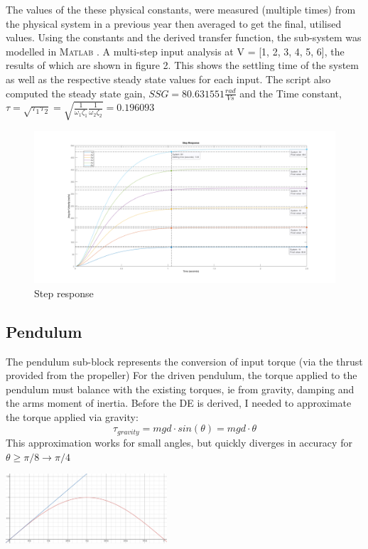 \documentclass[a4paper,11pt]{article}
\newcommand{\matlab}{\textsc{Matlab }} %
\begin{document}
The values of the these physical constants, were measured (multiple times) from the physical system in a previous year then averaged to get the final, utilised values. Using the constants and the derived transfer function, the sub-system was modelled in \matlab. A multi-step input analysis at V = [1, 2, 3, 4, 5, 6], the results of which are shown in figure 2. This shows the settling time of the system as well as the respective steady state values for each input. The script also computed the steady state gain, $SSG = 80.631551 \frac{rad}{Vs}$ and the Time constant, $\tau = \sqrt{\tau_1 \tau_2} = \sqrt{\frac{1}{\omega_1 \zeta_1} \frac{1}{\omega_2 \zeta_2}} = 0.196093$

\begin{figure}[h]
        \centering
        \includegraphics[width=\textwidth]{inc/motor_steps.png}
        \caption{Step response}
        \label{}
\end{figure}

\newpage
\subsection{Pendulum}
The pendulum sub-block represents the conversion of input torque (via the thrust provided from the propeller)
For the driven pendulum, the torque applied to the pendulum must balance with the existing torques, ie from gravity, damping and the arms moment of inertia. Before the DE is derived, I needed to approximate the torque applied via gravity:
$$\tau_{gravity} = mgd{\cdot}sin(\theta) = mgd{\cdot}\theta$$
This approximation works for small angles, but quickly diverges in accuracy for $\theta \ge \pi/8 \rightarrow \pi/4$ \\

\begin{center}
        \includegraphics[width=0.45\textwidth]{inc/sintheta.png}
\end{center}
\end{document}
